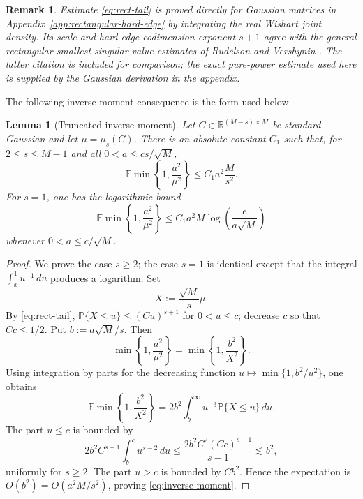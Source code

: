 \documentclass[11pt]{article}
\newtheorem{lemma}{Lemma}
\newtheorem{remark}{Remark}
\newcommand{\R}{\mathbb R}
\newcommand{\Pbb}{\mathbb P}
\newcommand{\Ebb}{\mathbb E}
\newcommand{\1}{\mathbf 1}
\begin{document}
\begin{remark}
Estimate \eqref{eq:rect-tail} is proved directly for Gaussian matrices in
Appendix~\ref{app:rectangular-hard-edge} by integrating the real Wishart joint
density.  Its scale and hard-edge codimension exponent \(s+1\) agree with the
general rectangular smallest-singular-value estimates of Rudelson and Vershynin
\cite{RudelsonVershynin2009}.  The latter citation is included for comparison;
the exact pure-power estimate used here is supplied by the Gaussian derivation
in the appendix.
\end{remark}

The following inverse-moment consequence is the form used below.

\begin{lemma}[Truncated inverse moment]
Let \(C\in\R^{(M-s)\times M}\) be standard Gaussian and let
\(\mu=\mu_s(C)\).  There is an absolute constant \(C_1\) such that, for
\(2\le s\le M-1\) and all \(0<a\le c s/\sqrt M\),
\begin{equation}
        \Ebb\min\left\{1,\frac{a^2}{\mu^2}\right\}
        \le
        C_1 a^2\frac{M}{s^2}.
        \label{eq:inverse-moment}
\end{equation}
For \(s=1\), one has the logarithmic bound
\begin{equation}
        \Ebb\min\left\{1,\frac{a^2}{\mu^2}\right\}
        \le
        C_1 a^2 M\log\left(\frac{e}{a\sqrt M}\right)
        \label{eq:inverse-moment-s1}
\end{equation}
whenever \(0<a\le c/\sqrt M\).
\end{lemma}

\begin{proof}
We prove the case \(s\ge2\); the case \(s=1\) is identical except that the integral
\(\int_x^1 u^{-1}\,du\) produces a logarithm.
Set
\[
        X:=\frac{\sqrt M}{s}\mu.
\]
By \eqref{eq:rect-tail}, \(\Pbb\{X\le u\}\le (Cu)^{s+1}\) for \(0<u\le c\); decrease \(c\) so that \(Cc\le1/2\). Put
\(b:=a\sqrt M/s\).  Then
\[
        \min\left\{1,\frac{a^2}{\mu^2}\right\}
        =
        \min\left\{1,\frac{b^2}{X^2}\right\}.
\]
Using integration by parts for the decreasing function \(u\mapsto\min\{1,b^2/u^2\}\),
one obtains
\[
        \Ebb\min\left\{1,\frac{b^2}{X^2}\right\}
        =
        2b^2\int_b^\infty u^{-3}\Pbb\{X\le u\}\,du.
\]
The part \(u\le c\) is bounded by
\[
        2b^2 C^{s+1}\int_b^c u^{s-2}\,du
        \le \frac{2b^2 C^2(Cc)^{s-1}}{s-1}
        \lesssim b^2,
\]
uniformly for \(s\ge2\).  The part \(u>c\) is bounded by \(Cb^2\).  Hence the expectation is
\(O(b^2)=O(a^2M/s^2)\), proving \eqref{eq:inverse-moment}.
\end{proof}
\end{document}
